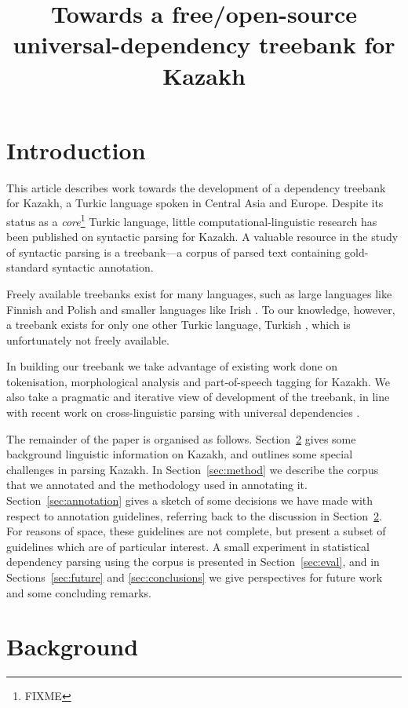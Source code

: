 \documentclass[a4paper,11pt, onecolumn,twoside]{article}
\title{Towards a free/open-source universal-dependency treebank for Kazakh}
\begin{document}
\maketitleabstract{}
\thispagestyle{firststyle}

\section{Introduction}

This article describes work towards the development of a dependency treebank for Kazakh, a Turkic language spoken in Central Asia and Europe.
Despite its status as a \emph{core}\footnote{FIXME} Turkic %
language, little computational-linguistic research has been published on syntactic
parsing for Kazakh.
A valuable resource in the study of syntactic parsing is
a treebank---a corpus of parsed text containing gold-standard syntactic annotation.

Freely available treebanks exist for many languages, such as large languages like Finnish \parencite{haverinen2013tdt,voutilainen11} 
and Polish \parencite{wolinski11} and smaller languages like Irish \parencite{Lynn12}. To our knowledge, however, a treebank exists for only one other Turkic language, Turkish \parencite{Oflazer03}, which is unfortunately not freely available.

In building our treebank we take advantage of existing work done on tokenisation,
morphological analysis and part-of-speech tagging for Kazakh. We also take a pragmatic
and iterative view of development of the treebank, in line with recent work 
on cross-linguistic parsing with universal dependencies \parencite{DeMarneffe14}.

The remainder of the paper is organised as follows. Section~\ref{sec:back} gives some
background linguistic information on Kazakh, and outlines some special challenges in
parsing Kazakh. In Section~\ref{sec:method} we describe the corpus that we annotated and the methodology
used in annotating it. Section~\ref{sec:annotation} gives a sketch of some decisions
we have made with respect to annotation guidelines, referring back to the discussion in
Section~\ref{sec:back}. For reasons of space, these guidelines are not complete, but
present a subset of guidelines which are of particular interest. A small experiment
in statistical dependency parsing using the corpus is presented in Section~\ref{sec:eval},
and in Sections~\ref{sec:future} and \ref{sec:conclusions} we give perspectives
for future work and some concluding remarks.


\section{Background}\label{sec:back}
\end{document}

